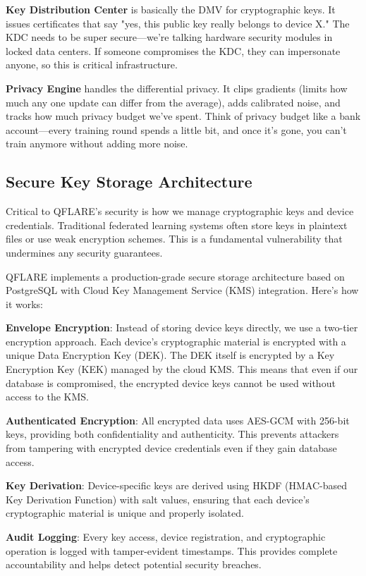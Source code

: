 \documentclass[onecolumn,11pt]{article}
\begin{document}
\textbf{Key Distribution Center} is basically the DMV for cryptographic keys. It issues certificates that say "yes, this public key really belongs to device X." The KDC needs to be super secure—we're talking hardware security modules in locked data centers. If someone compromises the KDC, they can impersonate anyone, so this is critical infrastructure.

\textbf{Privacy Engine} handles the differential privacy. It clips gradients (limits how much any one update can differ from the average), adds calibrated noise, and tracks how much privacy budget we've spent. Think of privacy budget like a bank account—every training round spends a little bit, and once it's gone, you can't train anymore without adding more noise.

\subsection{Secure Key Storage Architecture}

Critical to QFLARE's security is how we manage cryptographic keys and device credentials. Traditional federated learning systems often store keys in plaintext files or use weak encryption schemes. This is a fundamental vulnerability that undermines any security guarantees.

QFLARE implements a production-grade secure storage architecture based on PostgreSQL with Cloud Key Management Service (KMS) integration. Here's how it works:

\textbf{Envelope Encryption}: Instead of storing device keys directly, we use a two-tier encryption approach. Each device's cryptographic material is encrypted with a unique Data Encryption Key (DEK). The DEK itself is encrypted by a Key Encryption Key (KEK) managed by the cloud KMS. This means that even if our database is compromised, the encrypted device keys cannot be used without access to the KMS.

\textbf{Authenticated Encryption}: All encrypted data uses AES-GCM with 256-bit keys, providing both confidentiality and authenticity. This prevents attackers from tampering with encrypted device credentials even if they gain database access.

\textbf{Key Derivation}: Device-specific keys are derived using HKDF (HMAC-based Key Derivation Function) with salt values, ensuring that each device's cryptographic material is unique and properly isolated.

\textbf{Audit Logging}: Every key access, device registration, and cryptographic operation is logged with tamper-evident timestamps. This provides complete accountability and helps detect potential security breaches.
\end{document}
